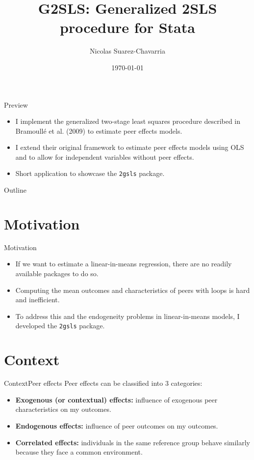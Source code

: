 \documentclass[aspectratio=169]{beamer}
\title[Generalized 2SLS]{ \textbf{G2SLS: Generalized 2SLS procedure for Stata}}
\author[Nicolas Suarez (Stanford University)]{Nicolas Suarez-Chavarria}
\institute[Stanford University]
{\large{Stanford University}}
\date[]{\today}
\begin{document}
\frame{\titlepage}

\begin{frame}{Preview}
\begin{itemize}
\item I implement the generalized two-stage least squares procedure described in Bramoullé et al. (2009) to estimate peer effects models.
\pause
\item I extend their original framework to estimate peer effects models using OLS and to allow for independent variables without peer effects.
\pause
\item Short application to showcase the \texttt{2gsls} package.
\end{itemize}
\end{frame}


\begin{frame}{Outline}
  \tableofcontents
\end{frame}

\section{Motivation}

\begin{frame}{Motivation}
\begin{itemize}
\item If we want to estimate a linear-in-means regression, there are no readily available packages to do so.
\pause
\item Computing the mean outcomes and characteristics of peers with loops is hard and inefficient.
\pause 
\item To address this and the endogeneity problems in linear-in-means models, I developed the \texttt{2gsls} package.
\end{itemize}
\end{frame}


\section{Context}
\begin{frame}{Context}{Peer effects}
Peer effects can be classified into 3 categories:
\pause
\begin{itemize}
\item \textbf{Exogenous (or contextual) effects:} influence of exogenous peer characteristics on my outcomes.
\item \textbf{Endogenous effects:} influence of peer outcomes on my outcomes.
\item \textbf{Correlated effects:} individuals in the same reference group behave similarly because they face a common environment.
\end{itemize}
\end{frame}
\end{document}
